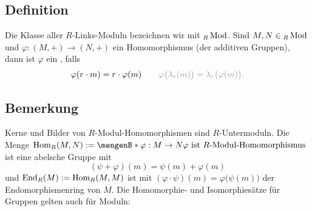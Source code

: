 \subsection[Definition: Klasse der $R$-Moduln, $R$-Modul-Homomorphismen]{Definition} %
\label{sub:27}
Die Klasse aller $R$-Links-Moduln bezeichnen wir mit $_R \operatorname{Mod}$. Sind $M,N \in {_R \operatorname{Mod}}$ und $\varphi : (M,+)\to (N,+)$ ein Homomorphismus (der additiven Gruppen), 
dann ist
$\varphi$ ein , falls
\[
	\varphi(r \cdot m) = r \cdot \varphi(m)\qquad  {\color{light_gray} \varphi \enbrace[\big]{\lambda_r(m)}= \lambda_r \enbrace[\big]{\varphi(m)}  .}
\]

\subsection[Bemerkung zu $\Hom_R(M,N)$]{Bemerkung} %
\label{sub:28}
Kerne und Bilder von $R$-Modul-Homomorphismen sind $R$-Untermoduln. Die Menge $\Hom_R(M,N) := \set[\varphi: M \to N]{\varphi \text{ ist $R$-Modul-Homomorphismus}} $ ist 
eine abelsche Gruppe mit 
\[
	(\psi+ \varphi)(m) = \psi(m)+ \varphi(m)
\]
und $\operatorname{End}_R(M) := \operatorname{Hom}_R(M,M)$ ist mit $(\varphi \cdot \psi)(m) = \varphi\big(\psi(m)\big)$ der Endomorphismenring von $M$.
Die Homomorphie- und Isomorphiesätze für Gruppen gelten auch für Moduln:

